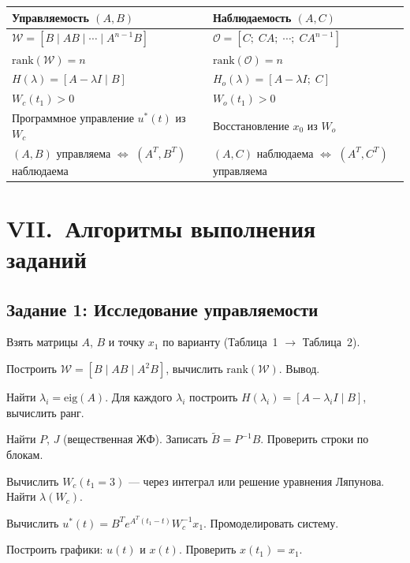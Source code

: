 \documentclass[12pt,a4paper]{article}
\begin{document}
	\begin{center}
		\begin{tabular}{p{7cm} p{7cm}}
			\toprule
			\textbf{\color{navy} Управляемость $(A,B)$} & \textbf{\color{teal} Наблюдаемость $(A,C)$} \\
			\midrule
			$\mathcal{W} = [B \mid AB \mid \cdots \mid A^{n-1}B]$ & $\mathcal{O} = [C;\; CA;\; \cdots;\; CA^{n-1}]$ \\[4pt]
			$\mathrm{rank}(\mathcal{W}) = n$ & $\mathrm{rank}(\mathcal{O}) = n$ \\[4pt]
			$H(\lambda) = [A-\lambda I \mid B]$ & $H_o(\lambda) = [A-\lambda I;\; C]$ \\[4pt]
			$W_c(t_1) > 0$ & $W_o(t_1) > 0$ \\[4pt]
			Программное управление $u^*(t)$ из $W_c$ & Восстановление $x_0$ из $W_o$ \\[4pt]
			$(A,B)$ управляема $\Leftrightarrow$ $(A^T,B^T)$ наблюдаема & $(A,C)$ наблюдаема $\Leftrightarrow$ $(A^T,C^T)$ управляема \\
			\bottomrule
		\end{tabular}
	\end{center}
	
	\newpage
	\section{VII.~Алгоритмы выполнения заданий}
	
	\subsection{Задание 1: Исследование управляемости}
	\begin{algo}
		\item Взять матрицы $A$, $B$ и точку $x_1$ по варианту (Таблица~1 $\to$ Таблица~2).
		\item Построить $\mathcal{W}=[B \mid AB \mid A^2B]$, вычислить $\mathrm{rank}(\mathcal{W})$. Вывод.
		\item Найти $\lambda_i = \mathrm{eig}(A)$. Для каждого $\lambda_i$ построить $H(\lambda_i)=[A-\lambda_i I \mid B]$, вычислить ранг.
		\item Найти $P$, $J$ (вещественная ЖФ). Записать $\tilde{B}=P^{-1}B$. Проверить строки по блокам.
		\item Вычислить $W_c(t_1\!=\!3)$ --- через интеграл или решение уравнения Ляпунова. Найти $\lambda(W_c)$.
		\item Вычислить $u^*(t) = B^Te^{A^T(t_1-t)}W_c^{-1}x_1$. Промоделировать систему.
		\item Построить графики: $u(t)$ и $x(t)$. Проверить $x(t_1) = x_1$.
	\end{algo}
	
\end{document}
